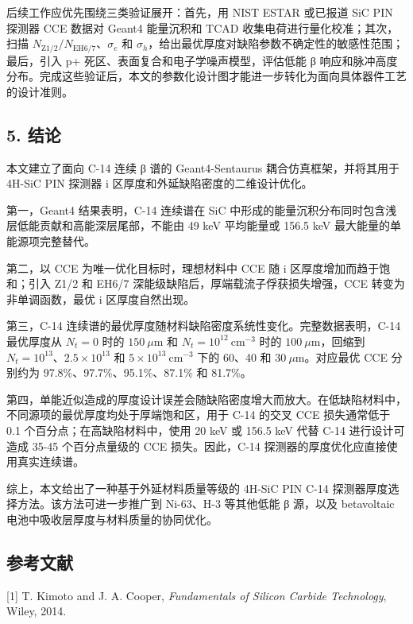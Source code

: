 \documentclass[
  10pt,
  a4paper,
]{ctexart}
\begin{document}
后续工作应优先围绕三类验证展开：首先，用 NIST ESTAR 或已报道 SiC PIN
探测器 CCE 数据对 Geant4 能量沉积和 TCAD
收集电荷进行量化校准；其次，扫描
\(N_{\mathrm{Z1/2}}/N_{\mathrm{EH6/7}}\)、\(\sigma_e\) 和
\(\sigma_h\)，给出最优厚度对缺陷参数不确定性的敏感性范围；最后，引入 p+
死区、表面复合和电子学噪声模型，评估低能 β
响应和脉冲高度分布。完成这些验证后，本文的参数化设计图才能进一步转化为面向具体器件工艺的设计准则。

\subsection{5. 结论}\label{ux7ed3ux8bba}

本文建立了面向 C-14 连续 β 谱的 Geant4-Sentaurus
耦合仿真框架，并将其用于 4H-SiC PIN 探测器 i
区厚度和外延缺陷密度的二维设计优化。

第一，Geant4 结果表明，C-14 连续谱在 SiC
中形成的能量沉积分布同时包含浅层低能贡献和高能深层尾部，不能由 49 keV
平均能量或 156.5 keV 最大能量的单能源项完整替代。

第二，以 CCE 为唯一优化目标时，理想材料中 CCE 随 i
区厚度增加而趋于饱和；引入 Z1/2 和 EH6/7
深能级缺陷后，厚端载流子俘获损失增强，CCE 转变为非单调函数，最优 i
区厚度自然出现。

第三，C-14 连续谱的最优厚度随材料缺陷密度系统性变化。完整数据表明，C-14
最优厚度从 \(N_t=0\) 时的 \(150\ \mu\mathrm{m}\) 和
\(N_t=10^{12}\ \mathrm{cm^{-3}}\) 时的 \(100\ \mu\mathrm{m}\)，回缩到
\(N_t=10^{13}\)、\(2.5\times10^{13}\) 和
\(5\times10^{13}\ \mathrm{cm^{-3}}\) 下的 60、40 和
\(30\ \mu\mathrm{m}\)。对应最优 CCE 分别约为
97.8\%、97.7\%、95.1\%、87.1\% 和 81.7\%。

第四，单能近似造成的厚度设计误差会随缺陷密度增大而放大。在低缺陷材料中，不同源项的最优厚度均处于厚端饱和区，用于
C-14 的交叉 CCE 损失通常低于 0.1 个百分点；在高缺陷材料中，使用 20 keV
或 156.5 keV 代替 C-14 进行设计可造成 35-45 个百分点量级的 CCE
损失。因此，C-14 探测器的厚度优化应直接使用真实连续谱。

综上，本文给出了一种基于外延材料质量等级的 4H-SiC PIN C-14
探测器厚度选择方法。该方法可进一步推广到 Ni-63、H-3 等其他低能 β
源，以及 betavoltaic 电池中吸收层厚度与材料质量的协同优化。

\subsection{参考文献}\label{ux53c2ux8003ux6587ux732e}

{[}1{]} T. Kimoto and J. A. Cooper, \emph{Fundamentals of Silicon
Carbide Technology}, Wiley, 2014.
\end{document}
